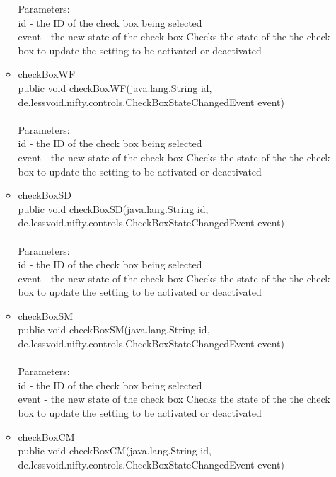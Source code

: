 \documentclass[letterpaper]{article}
\begin{document}
\begin{itemize}
\begin{itemize}
											Parameters: \\
											id - the ID of the check box being selected \\
											event - the new state of the check box Checks the state of the the check box to update the setting to be activated or deactivated
									\item	checkBoxWF \\
											public void checkBoxWF(java.lang.String id, \\
		              de.lessvoid.nifty.controls.CheckBoxStateChangedEvent event) \\ \\
											Parameters: \\
											id - the ID of the check box being selected \\
											event - the new state of the check box Checks the state of the the check box to update the setting to be activated or deactivated
									\item	checkBoxSD \\
											public void checkBoxSD(java.lang.String id, \\
		              de.lessvoid.nifty.controls.CheckBoxStateChangedEvent event) \\ \\
											Parameters: \\
											id - the ID of the check box being selected \\
											event - the new state of the check box Checks the state of the the check box to update the setting to be activated or deactivated
									\item	checkBoxSM \\
											public void checkBoxSM(java.lang.String id, \\
		              de.lessvoid.nifty.controls.CheckBoxStateChangedEvent event) \\ \\
											Parameters: \\
											id - the ID of the check box being selected \\
											event - the new state of the check box Checks the state of the the check box to update the setting to be activated or deactivated
									\item	checkBoxCM \\
											public void checkBoxCM(java.lang.String id, \\
		              de.lessvoid.nifty.controls.CheckBoxStateChangedEvent event) \\ \\

\end{itemize}
\end{itemize}
\end{document}
